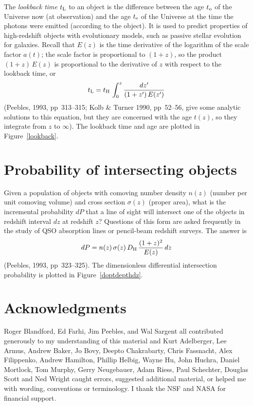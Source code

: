 The {\em lookback time\/} $t_{\rm L}$ to an object is the difference
between the age $t_{\rm o}$ of the Universe now (at observation) and
the age $t_{\rm e}$ of the Universe at the time the photons were
emitted (according to the object).  It is used to predict properties
of high-redshift objects with evolutionary models, such as passive
stellar evolution for galaxies.  Recall that $E(z)$ is the time
derivative of the logarithm of the scale factor $a(t)$; the scale
factor is proportional to $(1+z)$, so the product $(1+z)\,E(z)$ is
proportional to the derivative of $z$ with respect to the lookback
time, or
\begin{equation}
t_{\rm L} = t_{\rm H}\,\int_0^z \frac{dz'}{(1+z')\,E(z')}
\end{equation}
(Peebles, 1993, pp~313--315; Kolb \& Turner 1990, pp~52--56, give some
analytic solutions to this equation, but they are concerned with the
age $t(z)$, so they integrate from $z$ to $\infty$).  The lookback
time and age are plotted in Figure~\ref{lookback}.


\section{Probability of intersecting objects}
\label{sec:optdepth}

Given a population of objects with comoving number density $n(z)$
(number per unit comoving volume) and cross section $\sigma(z)$
(proper area), what is the incremental probability $dP$ that a line of
sight will intersect one of the objects in redshift interval $dz$ at
redshift $z$?  Questions of this form are asked frequently in the
study of QSO absorption lines or pencil-beam redshift surveys.  The
answer is
\begin{equation}
dP=n(z)\,\sigma(z)\,D_{\rm H}\,\frac{(1+z)^2}{E(z)}\,dz
\end{equation}
(Peebles, 1993, pp~323--325).  The dimensionless differential
intersection probability is plotted in Figure~\ref{doptdepthdz}.

\section*{Acknowledgments}

Roger Blandford, Ed Farhi, Jim Peebles, and Wal Sargent all contributed
generously to my understanding of this material and Kurt Adelberger,
Lee Armus, Andrew Baker, Jo Bovy, Deepto Chakrabarty, Chris Fassnacht, Alex
Filippenko, Andrew Hamilton, Phillip Helbig, Wayne Hu, John Huchra,
Daniel Mortlock, Tom Murphy, Gerry Neugebauer, Adam Riess, Paul
Schechter, Douglas Scott and Ned Wright caught errors, suggested
additional material, or helped me with wording, conventions or
terminology.  I thank the NSF and NASA for financial support.

